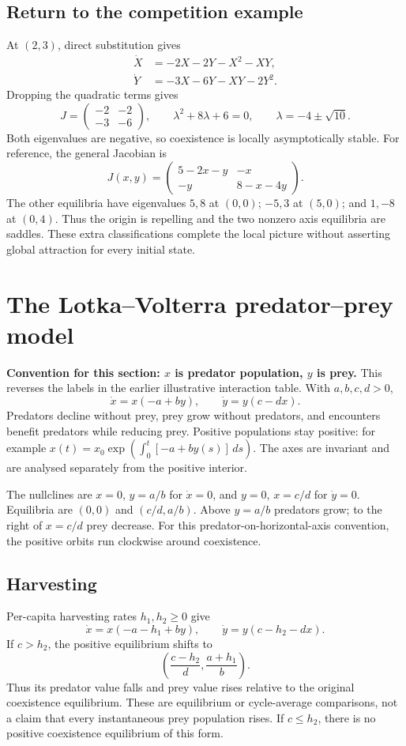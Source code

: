 \subsection{Return to the competition example}
At $(2,3)$, direct substitution gives
\begin{align*}
\dot X&=-2X-2Y-X^2-XY,\\
\dot Y&=-3X-6Y-XY-2Y^2.
\end{align*}
Dropping the quadratic terms gives
\[
J=\begin{pmatrix}-2&-2\\-3&-6\end{pmatrix},\qquad
\lambda^2+8\lambda+6=0,\qquad\lambda=-4\pm\sqrt{10}.
\]
Both eigenvalues are negative, so coexistence is locally asymptotically stable.
For reference, the general Jacobian is
\[
J(x,y)=\begin{pmatrix}5-2x-y&-x\\-y&8-x-4y\end{pmatrix}.
\]
The other equilibria have eigenvalues $5,8$ at $(0,0)$; $-5,3$ at $(5,0)$;
and $1,-8$ at $(0,4)$. Thus the origin is repelling and the two nonzero
axis equilibria are saddles. These extra classifications complete the
local picture without asserting global attraction for every initial state.

\section{The Lotka--Volterra predator--prey model}
\textbf{Convention for this section: $x$ is predator population, $y$ is prey.}
This reverses the labels in the earlier illustrative interaction table.
With $a,b,c,d>0$,
\begin{equation}\label{eq:applied-lv}
\dot x=x(-a+by),\qquad\dot y=y(c-dx).
\end{equation}
Predators decline without prey, prey grow without predators, and encounters
benefit predators while reducing prey. Positive populations stay positive:
for example $x(t)=x_0\exp\!\left(\int_0^t[-a+by(s)]\,ds\right)$.
The axes are invariant and are analysed separately from the positive interior.

The nullclines are $x=0$, $y=a/b$ for $\dot x=0$, and $y=0$, $x=c/d$
for $\dot y=0$. Equilibria are $(0,0)$ and $(c/d,a/b)$.
Above $y=a/b$ predators grow; to the right of $x=c/d$ prey decrease.
For this predator-on-horizontal-axis convention, the positive orbits
run clockwise around coexistence.

\subsection{Harvesting}
Per-capita harvesting rates $h_1,h_2\geq0$ give
\[
\dot x=x(-a-h_1+by),\qquad\dot y=y(c-h_2-dx).
\]
If $c>h_2$, the positive equilibrium shifts to
\[
\left(\frac{c-h_2}{d},\frac{a+h_1}{b}\right).
\]
Thus its predator value falls and prey value rises relative to the original
coexistence equilibrium. These are equilibrium or cycle-average comparisons,
not a claim that every instantaneous prey population rises. If $c\leq h_2$,
there is no positive coexistence equilibrium of this form.

